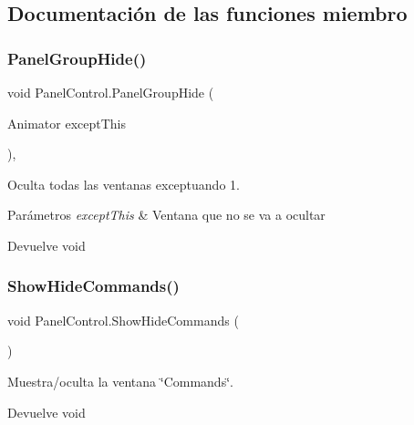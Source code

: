 \subsection{Documentación de las funciones miembro}
\mbox{\label{class_panel_control_a89ad407cadb68b103021f66db72c8716}} 
\subsubsection{\texorpdfstring{PanelGroupHide()}{PanelGroupHide()}}
{\footnotesize\ttfamily void Panel\+Control.\+Panel\+Group\+Hide (\begin{DoxyParamCaption}\item[{Animator}]{except\+This }\end{DoxyParamCaption})\hspace{0.3cm}{\ttfamily [inline]}, {\ttfamily [private]}}

Oculta todas las ventanas exceptuando 1. 
\begin{DoxyParams}{Parámetros}
{\em except\+This} & Ventana que no se va a ocultar \\
\hline
\end{DoxyParams}
\begin{DoxyReturn}{Devuelve}
void 
\end{DoxyReturn}
\mbox{\label{class_panel_control_ad1245999af785ac0aa3af3f1a6f40900}} 
\subsubsection{\texorpdfstring{ShowHideCommands()}{ShowHideCommands()}}
{\footnotesize\ttfamily void Panel\+Control.\+Show\+Hide\+Commands (\begin{DoxyParamCaption}{ }\end{DoxyParamCaption})\hspace{0.3cm}{\ttfamily [inline]}}

Muestra/oculta la ventana \char`\"{}\+Commands\char`\"{}. \begin{DoxyReturn}{Devuelve}
void 
\end{DoxyReturn}
\mbox{\label{class_panel_control_a2890c74bb81afa4e93e6d698ae5f5721}} 
